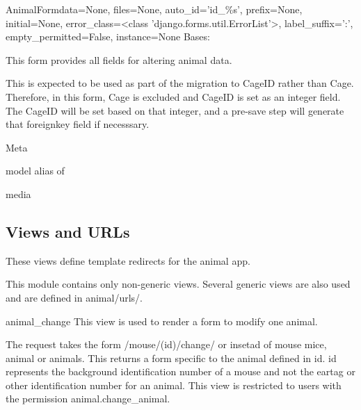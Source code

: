 \documentclass[letterpaper,10pt,english]{sphinxmanual}
\begin{document}
\hypertarget{animal.forms.AnimalForm}{}\begin{classdesc}{AnimalForm}{data=None, files=None, auto\_id='id\_\%s', prefix=None, initial=None, error\_class=\textless{}class 'django.forms.util.ErrorList'\textgreater{}, label\_suffix=':', empty\_permitted=False, instance=None}
Bases: 

This form provides all fields for altering animal data.

This is expected to be used as part of the migration to CageID rather than Cage.  Therefore, in this form, Cage is excluded and CageID is set as an integer field.
The CageID will be set based on that integer, and a pre-save step will generate that foreignkey field if necesssary.

\hypertarget{animal.forms.AnimalForm.Meta}{}\begin{classdesc}{Meta}{}~

\hypertarget{animal.forms.AnimalForm.Meta.model}{}\begin{memberdesc}{model}
alias of 
\end{memberdesc}
\end{classdesc}

\hypertarget{animal.forms.AnimalForm.media}{}\begin{memberdesc}[AnimalForm]{media}\end{memberdesc}
\end{classdesc}


\subsection{Views and URLs}
\hypertarget{module-animal.views}{}
\modulesynopsis{}
These views define template redirects for the animal app.

This module contains only non-generic views.  Several generic views are also used and are defined in animal/urls/.

\hypertarget{animal.views.animal_change}{}\begin{memberdesc}{animal\_change}
This view is used to render a form to modify one animal.

The request takes the form /mouse/(id)/change/ or insetad of mouse mice, animal or animals.  This returns a form specific to the animal defined in id.  id represents the background identification number of a mouse and not the eartag or other identification number for an animal.
This view is restricted to users with the permission animal.change\_animal.
\end{memberdesc}
\end{document}
